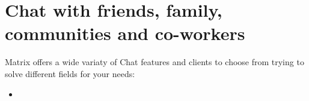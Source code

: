 \documentclass[../flyer.tex]{subfiles}
\begin{document}
\section*{Chat with friends, family, communities and co-workers}

Matrix offers a wide variaty of Chat features and clients to choose from
trying to solve different fields for your needs:

\begin{itemize}
    \item
\end{itemize}
\end{document}
